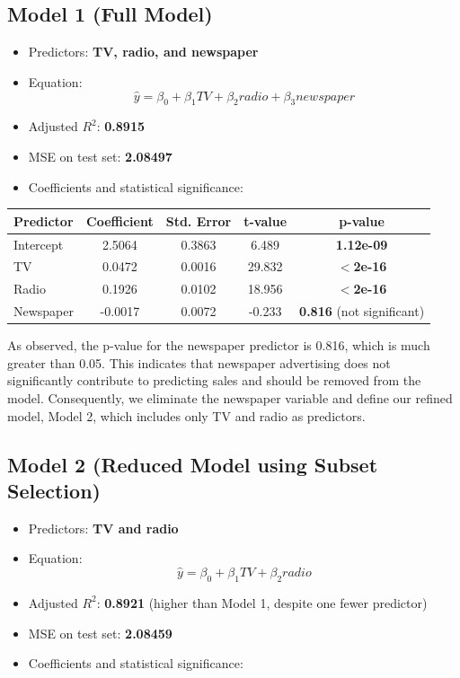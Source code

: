 \documentclass{article}
\begin{document}
\subsection{Model 1 (Full Model)}
\begin{itemize}
    \item Predictors: \textbf{TV, radio, and newspaper}
    \item Equation:
    \begin{equation}
        \hat{y} = \beta_0 + \beta_1 TV + \beta_2 radio + \beta_3 newspaper
    \end{equation}
    \item Adjusted $ R^2 $: \textbf{0.8915}
    \item MSE on test set: \textbf{2.08497}
    \item Coefficients and statistical significance:
\end{itemize}

\begin{table}[h]
    \centering
    \begin{tabular}{lcccc}
        \toprule
        Predictor  & Coefficient & Std. Error & t-value & p-value \\
        \midrule
        Intercept  & 2.5064      & 0.3863     & 6.489   & \textbf{1.12e-09} \\
        TV         & 0.0472      & 0.0016     & 29.832  & \textbf{$<$2e-16} \\
        Radio      & 0.1926      & 0.0102     & 18.956  & \textbf{$<$2e-16} \\
        Newspaper  & -0.0017     & 0.0072     & -0.233  & \textbf{0.816} (not significant) \\
        \bottomrule
    \end{tabular}
\end{table}

As observed, the p-value for the newspaper predictor is 0.816, which is much greater than 0.05. This indicates that newspaper advertising does not significantly contribute to predicting sales and should be removed from the model. Consequently, we eliminate the newspaper variable and define our refined model, Model 2, which includes only TV and radio as predictors.

\subsection{Model 2 (Reduced Model using Subset Selection)}
\begin{itemize}
    \item Predictors: \textbf{TV and radio}
    \item Equation:
    \begin{equation}
        \hat{y} = \beta_0 + \beta_1 TV + \beta_2 radio
    \end{equation}
    \item Adjusted $ R^2 $: \textbf{0.8921} (higher than Model 1, despite one fewer predictor)
    \item MSE on test set: \textbf{2.08459} 
    \item Coefficients and statistical significance:
\end{itemize}
\end{document}
